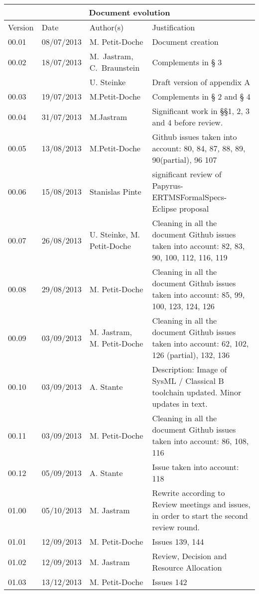 \documentclass{template/openetcs_report}
\begin{document}
\begin{tabular}{|p{2.2cm}|p{2cm}|p{3cm}|p{5cm}|}
\hline
\multicolumn{4}{|c|}{Document evolution} \\
\hline
Version &  Date & Author(s) & Justification  \\
\hline  
00.01 & 08/07/2013 & M. Petit-Doche &  Document creation  \\
00.02 & 18/07/2013 & M.~Jastram, C.~Braunstein & Complements in § 3 \\
 &  & U. Steinke & Draft version of appendix A \\
00.03 & 19/07/2013 & M.Petit-Doche & Complements in § 2 and § 4 \\
00.04 & 31/07/2013 & M.Jastram & Significant work in §§1, 2, 3 and 4 before review. \\
00.05 & 13/08/2013 & M.Petit-Doche & Github issues taken into account: 80, 84, 87, 88, 89, 90(partial), 96 107 \\
00.06 & 15/08/2013 & Stanislas Pinte & significant review of Papyrus-ERTMSFormalSpecs-Eclipse proposal \\
00.07 & 26/08/2013 & U. Steinke, M. Petit-Doche & Cleaning in all the document Github issues taken into account: 82, 83, 90, 100, 112, 116, 119 \\
00.08 & 29/08/2013 &  M. Petit-Doche & Cleaning in all the document Github issues taken into account: 85, 99, 100, 123, 124, 126 \\
00.09 & 03/09/2013 & M. Jastram,  M. Petit-Doche & Cleaning in all the document Github issues taken into account: 62, 102, 126 (partial), 132, 136 \\
00.10 & 03/09/2013 & A. Stante & Description: Image of SysML / Classical B toolchain updated. Minor updates in text. \\
00.11 & 03/09/2013 &  M. Petit-Doche & Cleaning in all the document Github issues taken into account: 86, 108, 116 \\
00.12 & 05/09/2013 &  A. Stante & Issue taken into account: 118 \\
01.00 & 05/10/2013 &  M. Jastram & Rewrite according to Review meetings and issues, in order to start the second review round. \\
01.01 & 12/09/2013 &  M. Petit-Doche & Issues 139, 144  \\
01.02 & 12/09/2013 &  M. Jastram & Review, Decision and Resource Allocation \\
01.03 & 13/12/2013 &  M. Petit-Doche & Issues 142  \\
\hline  
\end{tabular}
\end{document}
